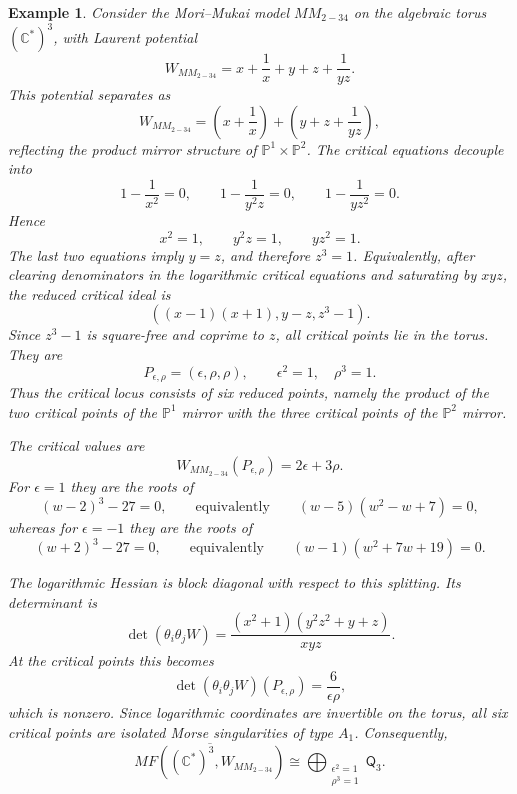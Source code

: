 \documentclass[11pt]{amsart}
\newtheorem{example}{Example}[section]
\newcommand{\MorseCat}[1]{\mathsf{Q}_{#1}}
\begin{document}
\begin{example}
Consider the Mori--Mukai model $MM_{2-34}$ on the algebraic torus
$(\mathbb{C}^*)^3$, with Laurent potential
\[
W_{MM_{2-34}}=x+\frac{1}{x}+y+z+\frac{1}{yz}.
\]
This potential separates as
\[
W_{MM_{2-34}}=\left(x+\frac{1}{x}\right)
+\left(y+z+\frac{1}{yz}\right),
\]
reflecting the product mirror structure of $\mathbb{P}^1\times\mathbb{P}^2$.
The critical equations decouple into
\[
1-\frac{1}{x^2}=0,
\qquad
1-\frac{1}{y^2z}=0,
\qquad
1-\frac{1}{yz^2}=0.
\]
Hence
\[
x^2=1,
\qquad
y^2z=1,
\qquad
yz^2=1.
\]
The last two equations imply $y=z$, and therefore $z^3=1$. Equivalently,
after clearing denominators in the logarithmic critical equations and
saturating by $xyz$, the reduced critical ideal is
\[
\left(
(x-1)(x+1),
y-z,
z^3-1
\right).
\]
Since $z^3-1$ is square-free and coprime to $z$, all critical points lie in
the torus. They are
\[
P_{\epsilon,\rho}=(\epsilon,\rho,\rho),
\qquad
\epsilon^2=1,
\quad
\rho^3=1.
\]
Thus the critical locus consists of six reduced points, namely the product of
the two critical points of the $\mathbb{P}^1$ mirror with the three critical
points of the $\mathbb{P}^2$ mirror.

The critical values are
\[
W_{MM_{2-34}}(P_{\epsilon,\rho})=2\epsilon+3\rho.
\]
For $\epsilon=1$ they are the roots of
\[
(w-2)^3-27=0,
\qquad\text{equivalently}\qquad
(w-5)(w^2-w+7)=0,
\]
whereas for $\epsilon=-1$ they are the roots of
\[
(w+2)^3-27=0,
\qquad\text{equivalently}\qquad
(w-1)(w^2+7w+19)=0.
\]

The logarithmic Hessian is block diagonal with respect to this splitting. Its
determinant is
\[
\det(\theta_i\theta_jW)
=\frac{(x^2+1)(y^2z^2+y+z)}{xyz}.
\]
At the critical points this becomes
\[
\det(\theta_i\theta_jW)(P_{\epsilon,\rho})=\frac{6}{\epsilon\rho},
\]
which is nonzero. Since logarithmic coordinates are invertible on the torus,
all six critical points are isolated Morse singularities of type $A_1$.
Consequently,
\[
\overline{MF((\mathbb{C}^*)^3,W_{MM_{2-34}})}
\cong \bigoplus_{\substack{\epsilon^2=1\\ \rho^3=1}}\MorseCat{3}.
\]
\end{example}
\end{document}
